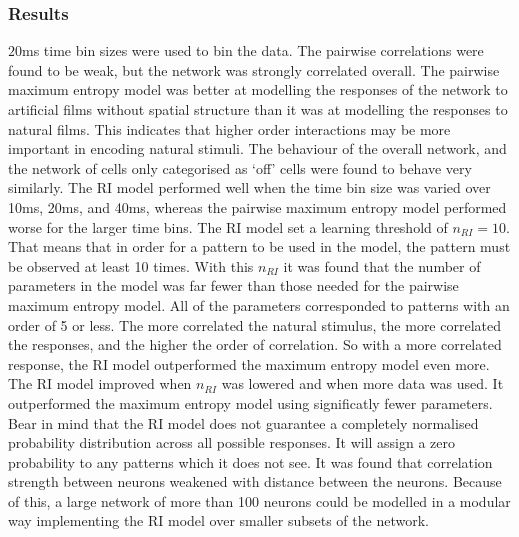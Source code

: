 \documentclass[a4paper,12pt]{article}
\theoremstyle{definition}
\begin{document}
\subsubsection*{Results}
	$20$ms time bin sizes were used to bin the data. The pairwise correlations were found to be weak, but the network was strongly correlated overall. The pairwise maximum entropy model was better at modelling the responses of the network to artificial films without spatial structure than it was at modelling the responses to natural films. This indicates that higher order interactions may be more important in encoding natural stimuli.
	The behaviour of the overall network, and the network of cells only categorised as `off' cells were found to behave very similarly. The RI model performed well when the time bin size was varied over 10ms, 20ms, and 40ms, whereas the pairwise maximum entropy model performed worse for the larger time bins.
	The RI model set a learning threshold of $n_{RI} = 10$. That means that in order for a pattern to be used in the model, the pattern must be observed at least 10 times. With this $n_{RI}$ it was found that the number of parameters in the model was far fewer than those needed for the pairwise maximum entropy model. All of the parameters corresponded to patterns with an order of 5 or less. 
	The more correlated the natural stimulus, the more correlated the responses, and the higher the order of correlation. So with a more correlated response, the RI model outperformed the maximum entropy model even more.
	The RI model improved when $n_{RI}$ was lowered and when more data was used. It outperformed the maximum entropy model using significatly fewer parameters.
	Bear in mind that the RI model does not guarantee a completely normalised probability distribution across all possible responses. It will assign a zero probability to any patterns which it does not see.
	It was found that correlation strength between neurons weakened with distance between the neurons. Because of this, a large network of more than 100 neurons could be modelled in a modular way implementing the RI model over smaller subsets of the network.
\end{document}
